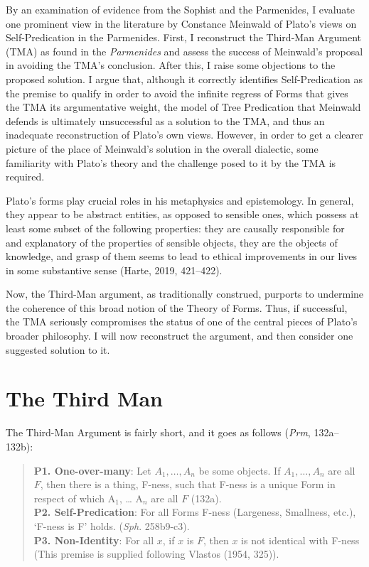 By an examination of evidence from the Sophist and the Parmenides, I evaluate one prominent view in the literature by Constance Meinwald of Plato's views on Self-Predication in the Parmenides. First, I reconstruct the Third-Man Argument (TMA) as found in the \textit{Parmenides} and assess the success of Meinwald's proposal in avoiding the TMA's conclusion. After this, I raise some objections to the proposed solution. I argue that, although it correctly identifies Self-Predication as the premise to qualify in order to avoid the infinite regress of Forms that gives the TMA its argumentative weight, the model of Tree Predication that Meinwald defends is ultimately unsuccessful as a solution to the TMA, and thus an inadequate reconstruction of Plato's own views. However, in order to get a clearer picture of the place of Meinwald's solution in the overall dialectic, some familiarity with Plato's theory and the challenge posed to it by the TMA is required. 

Plato's forms play crucial roles in his metaphysics and epistemology. In general, they appear to be abstract entities, as opposed to sensible ones, which possess at least some subset of the following properties: they are causally responsible for and explanatory of the properties of sensible objects, they are the objects of knowledge, and grasp of them seems to lead to ethical improvements in our lives in some substantive sense (Harte, 2019, 421--422). 

Now, the Third-Man argument, as traditionally construed, purports to undermine the coherence of this broad notion of the Theory of Forms. Thus, if successful, the TMA seriously compromises the status of one of the central pieces of Plato's broader philosophy. I will now reconstruct the argument, and then consider one suggested solution to it. 

\section{The Third Man}

The Third-Man Argument is fairly short, and it goes as follows (\textit{Prm}, 132a--132b):

\begin{quote}
\textbf{P1. One-over-many}: Let $A_1, \dots , A_n$ be some objects. If $A_1, \dots, A_n$ are all $F$, then there is a thing, F-ness, such that F-ness is a unique Form in respect of which A$_1$, … A$_n$ are all $F$ (132a). \\
\textbf{P2. Self-Predication}: For all Forms F-ness (Largeness, Smallness, etc.), `F-ness is F' holds. (\textit{Sph}. 258b9-c3). \\
\textbf{P3. Non-Identity}: For all $x$, if $x$ is $F$, then $x$ is not identical with F-ness (This premise is supplied following Vlastos (1954, 325)).
\end{quote}


